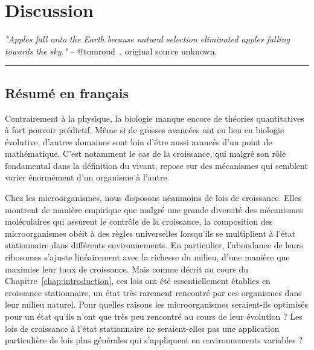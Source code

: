 \chapter{Discussion}
\label{chap:discussion}

\textit{"Apples fall onto the Earth because natural selection eliminated apples falling towards the sky."} -- @tomroud~\cite{tomroud_tom_2016}, original source unknown.


\begin{center}
\noindent\rule{4cm}{0.1pt}
\end{center}

\section*{Résumé en français}
Contrairement à la physique, la biologie manque encore de théories quantitatives à fort pouvoir prédictif.
Même si de grosses avancées ont eu lieu en biologie évolutive, d'autres domaines sont loin d'être aussi avancés d'un point de mathématique.
C'est notamment le cas de la croissance, qui malgré son rôle fondamental dans la définition du vivant, repose sur des mécanismes qui semblent varier énormément d'un organisme à l'autre.

Chez les microorganismes, nous disposons néanmoins de lois de croissance.
Elles montrent de manière empirique que malgré une grande diversité des mécanismes moléculaires qui assurent le contrôle de la croissance, la composition des microorganismes obéit à des règles universelles lorsqu'ils se multiplient à l'état stationnaire dans différents environnements.
En particulier, l'abondance de leurs ribosomes s'ajuste linéairement avec la richesse du milieu, d'une manière que maximise leur taux de croissance.
Mais comme décrit au cours du Chapitre~\ref{chap:introduction}, ces lois ont été essentiellement établies en croissance stationnaire, un état très rarement rencontré par ces organismes dans leur milieu naturel.
Pour quelles raisons les microorganismes seraient-ils optimisés pour un état qu'ils n'ont que très peu rencontré au cours de leur évolution ?
Les lois de croissance à l'état stationnaire ne seraient-elles pas une application particulière de lois plus générales qui s'appliquent en environnements variables ?

